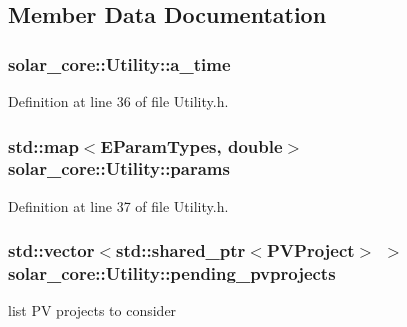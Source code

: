 \subsection{Member Data Documentation}
\hypertarget{classsolar__core_1_1_utility_acc68b5e07894b8c3918a7512391c6f7e}{}
\subsubsection[{a\+\_\+time}]{ solar\+\_\+core\+::\+Utility\+::a\+\_\+time\hspace{0.3cm}{\ttfamily [protected]}}\label{classsolar__core_1_1_utility_acc68b5e07894b8c3918a7512391c6f7e}


Definition at line 36 of file Utility.\+h.

\hypertarget{classsolar__core_1_1_utility_a9df3a727c125d50170b7c0e190de460a}{}
\subsubsection[{params}]{\setlength{\rightskip}{0pt plus 5cm}std\+::map$<${\bf E\+Param\+Types}, double$>$ solar\+\_\+core\+::\+Utility\+::params\hspace{0.3cm}{\ttfamily [protected]}}\label{classsolar__core_1_1_utility_a9df3a727c125d50170b7c0e190de460a}


Definition at line 37 of file Utility.\+h.

\hypertarget{classsolar__core_1_1_utility_a80f37d5cc4772161923aaacb73e45e81}{}
\subsubsection[{pending\+\_\+pvprojects}]{\setlength{\rightskip}{0pt plus 5cm}std\+::vector$<$std\+::shared\+\_\+ptr$<${\bf P\+V\+Project}$>$ $>$ solar\+\_\+core\+::\+Utility\+::pending\+\_\+pvprojects\hspace{0.3cm}{\ttfamily [protected]}}\label{classsolar__core_1_1_utility_a80f37d5cc4772161923aaacb73e45e81}
list P\+V projects to consider 

